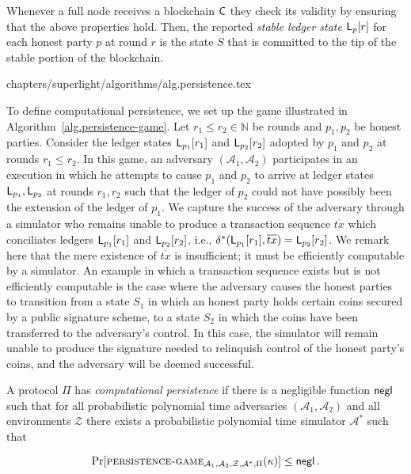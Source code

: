 Whenever a full node receives a blockchain $\mathsf{C}$ they check its validity by
ensuring that the above properties hold. Then, the reported \emph{stable ledger
state} $\mathsf{L}_{p}[r]$ for each honest party $p$ at round $r$ is the state $S$
that is committed to the tip of the stable portion of the blockchain.

{chapters/superlight/algorithms/alg.persistence.tex}

To define computational persistence, we set up the game illustrated in
Algorithm~\ref{alg.persistence-game}.
Let
$r_1 \leq r_2 \in \mathbb{N}$ be rounds and $p_1, p_2$ be honest parties.
Consider the ledger states $\mathsf{L}_{p_1}[r_1]$ and $\mathsf{L}_{p_2}[r_2]$
adopted by $p_1$ and $p_2$ at rounds $r_1 \leq r_2$.
In this game, an adversary
$(\mathcal{A}_1, \mathcal{A}_2)$ participates in an execution in which he
attempts to cause $p_1$ and $p_2$ to arrive at ledger states
$\mathsf{L}_{p_1}, \mathsf{L}_{p_2}$ at rounds $r_1, r_2$ such that the ledger of
$p_2$ could not have possibly been the
extension of the ledger of $p_1$. We capture the success of the adversary
through a simulator who remains unable to produce a transaction sequence
$\overline{tx}$ which conciliates ledgers $\mathsf{L}_{p_1}[r_1]$ and
$\mathsf{L}_{p_2}[r_2]$, i.e.,
$\delta^*(\mathsf{L}_{p_1}[r_1], \overline{tx}) = \mathsf{L}_{p_2}[r_2]$. We remark
here that the mere existence of $\overline{tx}$ is insufficient; it must be
efficiently computable by a simulator. An example in which a transaction
sequence exists but is not efficiently computable is the case where the
adversary causes the honest parties to transition from a state $S_1$ in which
an honest party holds certain coins secured by a public signature scheme, to
a state $S_2$ in which the coins have been transferred to the adversary's
control. In this case, the simulator will remain unable to produce the signature
needed to relinquish control of the honest party's coins, and the adversary will
be deemed successful.

\begin{definition}
  A protocol $\Pi$ has \emph{computational persistence} if there is a negligible
  function $\mathsf{negl}$ such that for all probabilistic
  polynomial time adversaries $(\mathcal{A}_1, \mathcal{A}_2)$ and all environments $\mathcal{Z}$
  there exists a probabilistic
  polynomial time simulator $\mathcal{A}^*$ such that

  \[
  \Pr[\textsc{persistence}\textsc{-}\textsc{game}_{\mathcal{A}_1,\mathcal{A}_2,\mathcal{Z},\mathcal{A}^*,\Pi}(\kappa)]
  \leq \mathsf{negl}
  \,.
  \]
\end{definition}

